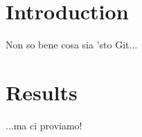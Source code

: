 \documentclass[10pt,twocolumn]{article}
\begin{document}
\section{Introduction}
Non so bene cosa sia 'sto Git...
\section{Results}
...ma ci proviamo!
\end{document}
